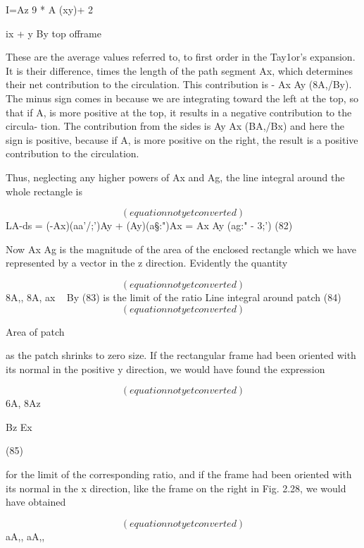 I=Az 9 *
A (xy)+ 2 {ix + y By top offrame

These are the average values referred to, to first order in the Tay1or's
expansion. It is their difference, times the length of the path segment
Ax, which determines their net contribution to the circulation. This
contribution is - Ax Ay (8A,/By). The minus sign comes in because
we are integrating toward the left at the top, so that if A, is more
positive at the top, it results in a negative contribution to the circula-
tion. The contribution from the sides is Ay Ax (BA,/Bx) and here
the sign is positive, because if A, is more positive on the right, the
result is a positive contribution to the circulation.

 

Thus, neglecting any higher powers of Ax and Ag, the line integral
around the whole rectangle is

\begin{equation}
(equation not yet converted)
\end{equation}
LA-ds = (-Ax)(aa'/;')Ay + (Ay)(a§:")Ax
= Ax Ay (ag:" - 3;') (82)

Now Ax Ag is the magnitude of the area of the enclosed rectangle
which we have represented by a vector in the z direction. Evidently
the quantity

\begin{equation}
(equation not yet converted)
\end{equation}
8A,, 8A,
ax ~ By (83)
is the limit of the ratio
Line integral around patch (84)
\begin{equation}
(equation not yet converted)
\end{equation}

Area of patch

as the patch shrinks to zero size. If the rectangular frame had been
oriented with its normal in the positive y direction, we would have
found the expression

\begin{equation}
(equation not yet converted)
\end{equation}
6A, 8Az

Bz Ex

(85)

for the limit of the corresponding ratio, and if the frame had been
oriented with its normal in the x direction, like the frame on the right
in Fig. 2.28, we would have obtained

\begin{equation}
(equation not yet converted)
\end{equation}
aA,, aA,,

}
